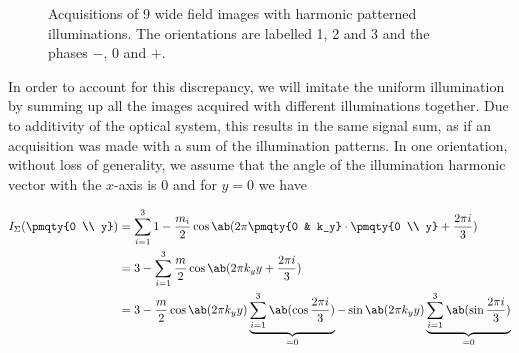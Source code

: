 \begin{figure}[h]
    \caption{Acquisitions of 9 wide field images with harmonic patterned illuminations. The orientations are labelled
    1, 2 and 3 and the phases \(-\), \(0\) and \(+\).}
\end{figure}

In order to account for this discrepancy, we will imitate the uniform illumination by summing up all the images acquired
    with different illuminations together.
Due to additivity of the optical system, this results in the same signal sum, as if an acquisition was made with a sum
    of the illumination patterns.
In one orientation, without loss of generality, we assume that the angle of the illumination harmonic vector with the
    \(x\)-axis is \(0\) and for \(y = 0\) we have

\begin{marginfigure}
  \caption{Sum of the illumination pattern intensities results in a uniform intensity.}
\end{marginfigure}

\begin{equation*}
    \begin{split}
        I_\Sigma ( \pmqty{0 \\ y}) &= \sum_{i=1}^3 1 - \frac{m_i}{2} \cos\ab(2\pi \pmqty{0 & k_y} \cdot \pmqty{0 \\ y}
        + \frac{2\pi i}{3}) \\
                                    & = 3 - \sum_{i=1}^3 \frac{m}{2} \cos\ab(2\pi k_y y + 
                                    \frac{2\pi i}{3}) \\
                                    & = 3 -\frac{m}{2} \cos\ab(2\pi k_y y)\underbrace{\sum_{i=1}^3\ab(\cos\frac{2\pi
                                    i}{3})}_{=0}
                                    - \sin\ab(2\pi  k_y y)\underbrace{\sum_{i=1}^3\ab(\sin\frac{2\pi i}{3})}_{=0} \\
    \end{split}
\end{equation*}


